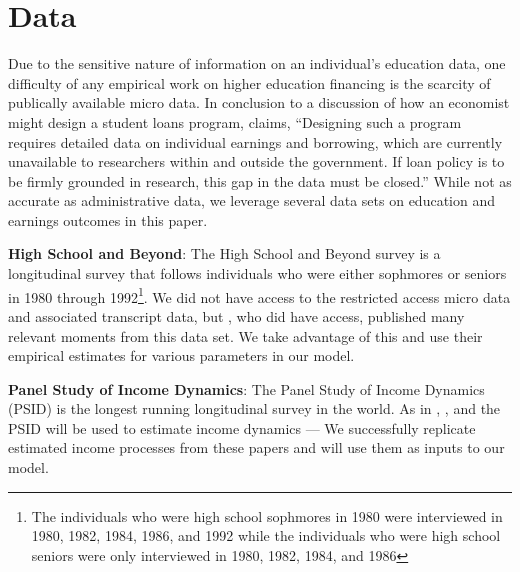 
\section{Data} \label{sec:data_appendix}

  Due to the sensitive nature of information on an individual's education data, one difficulty of
  any empirical work on higher education financing is the scarcity of publically available micro
  data. In conclusion to a discussion of how an economist might design a student loans program,
  \cite{Dynarski2014} claims, ``Designing such a program requires detailed data on individual
  earnings and borrowing, which are currently unavailable to researchers within and outside the
  government. If loan policy is to be firmly grounded in research, this gap in the data must be
  closed.'' While not as accurate as administrative data, we leverage several data sets on education
  and earnings outcomes in this paper.

  \textbf{High School and Beyond}: The High School and Beyond survey is a longitudinal survey that
  follows individuals who were either sophmores or seniors in 1980 through 1992\footnote{The
  individuals who were high school sophmores in 1980 were interviewed in 1980, 1982, 1984, 1986, and
  1992 while the individuals who were high school seniors were only interviewed in 1980, 1982, 1984,
  and 1986}. We did not have access to the restricted access micro data and associated transcript
  data, but \cite{HendricksLeukhina2017}, who did have access, published many relevant moments from
  this data set. We take advantage of this and use their empirical estimates for various parameters
  in our model.

  \textbf{Panel Study of Income Dynamics}: The Panel Study of Income Dynamics (PSID) is the longest
  running longitudinal survey in the world. As in \cite{CarrollSamwick1997}, \cite{Guvenen2009}, and
  \cite{Hryshko2012} the PSID will be used to estimate income dynamics --- We successfully replicate
  estimated income processes from these papers and will use them as inputs to our model.
